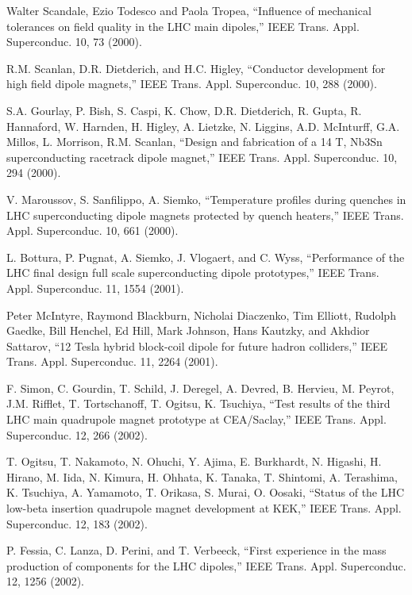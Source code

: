 \noindent [9.321] Walter Scandale, Ezio Todesco and Paola Tropea, ``Influence of mechanical tolerances
on field quality in the LHC main dipoles,” IEEE Trans. Appl. Superconduc.
10, 73 (2000).

\noindent [9.322] R.M. Scanlan, D.R. Dietderich, and H.C. Higley, ``Conductor development for
high field dipole magnets,” IEEE Trans. Appl. Superconduc. 10, 288 (2000).

\noindent [9.323] S.A. Gourlay, P. Bish, S. Caspi, K. Chow, D.R. Dietderich, R. Gupta, R. Hannaford,
W. Harnden, H. Higley, A. Lietzke, N. Liggins, A.D. McInturff, G.A. Millos, L.
Morrison, R.M. Scanlan, ``Design and fabrication of a 14 T, Nb3Sn superconducting
racetrack dipole magnet,” IEEE Trans. Appl. Superconduc. 10, 294 (2000).

\noindent [9.324] V. Maroussov, S. Sanfilippo, A. Siemko, ``Temperature profiles during quenches in
LHC superconducting dipole magnets protected by quench heaters,” IEEE Trans.
Appl. Superconduc. 10, 661 (2000).

\noindent [9.325] L. Bottura, P. Pugnat, A. Siemko, J. Vlogaert, and C. Wyss, ``Performance of
the LHC final design full scale superconducting dipole prototypes,” IEEE Trans.
Appl. Superconduc. 11, 1554 (2001).

\noindent [9.326] Peter McIntyre, Raymond Blackburn, Nicholai Diaczenko, Tim Elliott, Rudolph
Gaedke, Bill Henchel, Ed Hill, Mark Johnson, Hans Kautzky, and Akhdior Sattarov,
``12 Tesla hybrid block-coil dipole for future hadron colliders,” IEEE Trans.
Appl. Superconduc. 11, 2264 (2001).

\noindent [9.327] F. Simon, C. Gourdin, T. Schild, J. Deregel, A. Devred, B. Hervieu, M. Peyrot,
J.M. Rifflet, T. Tortschanoff, T. Ogitsu, K. Tsuchiya, ``Test results of the third
LHC main quadrupole magnet prototype at CEA/Saclay,” IEEE Trans. Appl.
Superconduc. 12, 266 (2002).

\noindent [9.328] T. Ogitsu, T. Nakamoto, N. Ohuchi, Y. Ajima, E. Burkhardt, N. Higashi, H. Hirano,
M. Iida, N. Kimura, H. Ohhata, K. Tanaka, T. Shintomi, A. Terashima,
K. Tsuchiya, A. Yamamoto, T. Orikasa, S. Murai, O. Oosaki, ``Status of the LHC
low-beta insertion quadrupole magnet development at KEK,” IEEE Trans. Appl.
Superconduc. 12, 183 (2002).

\noindent [9.329] P. Fessia, C. Lanza, D. Perini, and T. Verbeeck, ``First experience in the mass
production of components for the LHC dipoles,” IEEE Trans. Appl. Superconduc.
12, 1256 (2002).

